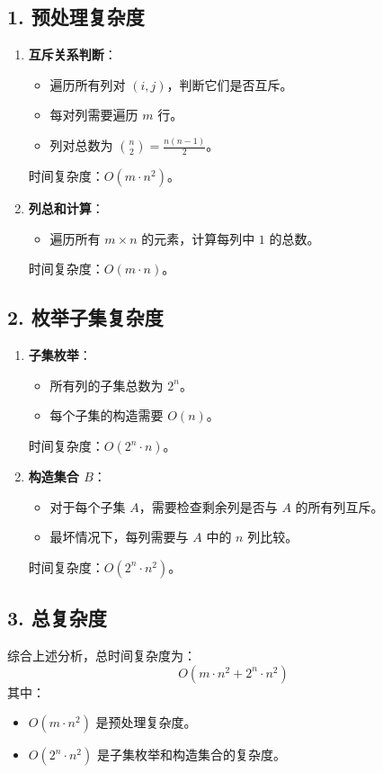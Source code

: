 \documentclass[UTF8]{ctexart}
\begin{document}
\subsection*{1. 预处理复杂度}
\begin{enumerate}
    \item \textbf{互斥关系判断}：
    \begin{itemize}
        \item 遍历所有列对 $(i, j)$，判断它们是否互斥。
        \item 每对列需要遍历 $m$ 行。
        \item 列对总数为 $\binom{n}{2} = \frac{n(n-1)}{2}$。
    \end{itemize}
    时间复杂度：$O(m \cdot n^2)$。

    \item \textbf{列总和计算}：
    \begin{itemize}
        \item 遍历所有 $m \times n$ 的元素，计算每列中 $1$ 的总数。
    \end{itemize}
    时间复杂度：$O(m \cdot n)$。
\end{enumerate}

\subsection*{2. 枚举子集复杂度}
\begin{enumerate}
    \item \textbf{子集枚举}：
    \begin{itemize}
        \item 所有列的子集总数为 $2^n$。
        \item 每个子集的构造需要 $O(n)$。
    \end{itemize}
    时间复杂度：$O(2^n \cdot n)$。

    \item \textbf{构造集合 $B$}：
    \begin{itemize}
        \item 对于每个子集 $A$，需要检查剩余列是否与 $A$ 的所有列互斥。
        \item 最坏情况下，每列需要与 $A$ 中的 $n$ 列比较。
    \end{itemize}
    时间复杂度：$O(2^n \cdot n^2)$。
\end{enumerate}

\subsection*{3. 总复杂度}
综合上述分析，总时间复杂度为：
\[
O(m \cdot n^2 + 2^n \cdot n^2)
\]
其中：
\begin{itemize}
    \item $O(m \cdot n^2)$ 是预处理复杂度。
    \item $O(2^n \cdot n^2)$ 是子集枚举和构造集合的复杂度。
\end{itemize}
\end{document}
